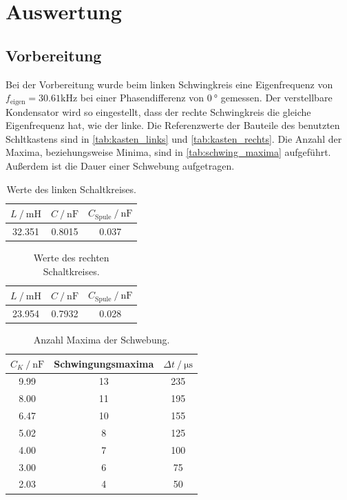 \section{Auswertung}
\label{sec:Auswertung}

\subsection{Vorbereitung}
Bei der Vorbereitung wurde beim linken Schwingkreis eine Eigenfrequenz von $f_{\text{eigen}}=30.61 \si{\kilo\hertz}$ bei einer
Phasendifferenz von $\SI{0}{\degree}$ gemessen. 
Der verstellbare Kondensator wird so eingestellt, dass der rechte Schwingkreis die gleiche Eigenfrequenz hat, wie der linke.
Die Referenzwerte der Bauteile des benutzten Schltkastens sind in \autoref{tab:kasten_links} und \autoref{tab:kasten_rechts}.
Die Anzahl der Maxima, beziehungsweise Minima, sind in \autoref{tab:schwing_maxima} aufgeführt. Außerdem ist die 
Dauer einer Schwebung aufgetragen.

\begin{table}
  \centering
  \caption{Werte des linken Schaltkreises.}
  \label{tab:kasten_links}
  \begin{tabular}{c c c}
      \toprule
      {$L \:/\: \si{\milli\henry} $} & $C \:/\: \si{\nano\farad} $ & $C_{\text{Spule}}\:/\: \si{\nano\farad}$ \\
      \midrule
      32.351 & 0.8015 & 0.037 \\
      \bottomrule
  \end{tabular}
\end{table}

\begin{table}
  \centering
  \caption{Werte des rechten Schaltkreises.}
  \label{tab:kasten_rechts}
  \begin{tabular}{c c c}
      \toprule
      {$L \:/\: \si{\milli\henry} $} & $C \:/\: \si{\nano\farad} $ & $C_{\text{Spule}}\:/\: \si{\nano\farad}$ \\
      \midrule
      23.954 & 0.7932 & 0.028 \\
      \bottomrule
  \end{tabular}
\end{table}

\begin{table}
  \centering
  \caption{Anzahl Maxima der Schwebung.}
  \label{tab:schwing_maxima}
  \begin{tabular}{c c c}
      \toprule
      {$C_K \:/\: \si{\nano\farad}$} & Schwingungsmaxima & $\Delta t\:/\: \si{\micro\second}$ \\
      \midrule
      9.99  & 13 & 235 \\ 
      8.00  & 11 & 195 \\ 
      6.47  & 10 & 155 \\ 
      5.02 & 8 & 125 \\ 
      4.00 & 7 & 100 \\
      3.00 & 6 & 75 \\
      2.03 & 4 & 50\\ 
      \bottomrule
  \end{tabular}
\end{table}


